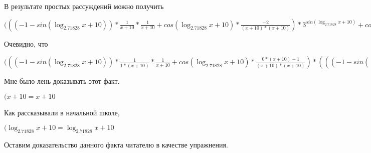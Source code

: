 \documentclass[12pt,a4paper,fleqn]{article}
\theoremstyle{definition}
\begin{document}
В результате простых рассуждений можно получить

$((( -1  - sin(\log_{ 2.71828 }{ x  +  10 })) * \frac{ 1 }{ x  +  10 }
 * \frac{ 1 }{ x  +  10 }
 + cos(\log_{ 2.71828 }{ x  +  10 }) * \frac{ -2 }{( x  +  10 ) * ( x  +  10 )}
) * { 3 }^{sin(\log_{ 2.71828 }{ x  +  10 })} + cos(\log_{ 2.71828 }{ x  +  10 }) * \frac{ 1 }{ x  +  10 }
 * cos(\log_{ 2.71828 }{ x  +  10 }) * \frac{ 1 }{ x  +  10 }
 * { 3 }^{sin(\log_{ 2.71828 }{ x  +  10 })} = (( -1  - sin(\log_{ 2.71828 }{ x  +  10 })) * \frac{ 1 }{ x  +  10 }
 * \frac{ 1 }{ x  +  10 }
 + cos(\log_{ 2.71828 }{ x  +  10 }) * \frac{ -2 }{( x  +  10 ) * ( x  +  10 )}
) * { 3 }^{sin(\log_{ 2.71828 }{ x  +  10 })} + cos(\log_{ 2.71828 }{ x  +  10 }) * \frac{ 1 }{ x  +  10 }
 * cos(\log_{ 2.71828 }{ x  +  10 }) * \frac{ 1 }{ x  +  10 }
 * { 3 }^{sin(\log_{ 2.71828 }{ x  +  10 })}$

Очевидно, что

$((( -1  - sin(\log_{ 2.71828 }{ x  +  10 })) * \frac{ 1 }{ 1  * ( x  +  10 )}
 * \frac{ 1 }{ x  +  10 }
 + cos(\log_{ 2.71828 }{ x  +  10 }) * \frac{ 0  * ( x  +  10 ) -  1 }{( x  +  10 ) * ( x  +  10 )}
) * ((( -1  - sin(\log_{ 2.71828 }{ x  +  10 })) * \frac{ 1 }{ x  +  10 }
 * \frac{ 1 }{ x  +  10 }
 + cos(\log_{ 2.71828 }{ x  +  10 }) * \frac{ -2 }{( x  +  10 ) * ( x  +  10 )}
) * { 3 }^{sin(\log_{ 2.71828 }{ x  +  10 })} + cos(\log_{ 2.71828 }{ x  +  10 }) * \frac{ 1 }{ x  +  10 }
 * cos(\log_{ 2.71828 }{ x  +  10 }) * \frac{ 1 }{ x  +  10 }
 * { 3 }^{sin(\log_{ 2.71828 }{ x  +  10 })}) = (( -1  - sin(\log_{ 2.71828 }{ x  +  10 })) * \frac{ 1 }{ 1  * ( x  +  10 )}
 * \frac{ 1 }{ x  +  10 }
 + cos(\log_{ 2.71828 }{ x  +  10 }) * \frac{ 0  * ( x  +  10 ) -  1 }{( x  +  10 ) * ( x  +  10 )}
) * ((( -1  - sin(\log_{ 2.71828 }{ x  +  10 })) * \frac{ 1 }{ x  +  10 }
 * \frac{ 1 }{ x  +  10 }
 + cos(\log_{ 2.71828 }{ x  +  10 }) * \frac{ -2 }{( x  +  10 ) * ( x  +  10 )}
) * { 3 }^{sin(\log_{ 2.71828 }{ x  +  10 })} + cos(\log_{ 2.71828 }{ x  +  10 }) * \frac{ 1 }{ x  +  10 }
 * cos(\log_{ 2.71828 }{ x  +  10 }) * \frac{ 1 }{ x  +  10 }
 * { 3 }^{sin(\log_{ 2.71828 }{ x  +  10 })})$

Мне было лень доказывать этот факт.

$( x  +  10  =  x  +  10 $

Как рассказывали в начальной школе,

$(\log_{ 2.71828 }{ x  +  10 } = \log_{ 2.71828 }{ x  +  10 }$

Оставим доказательство данного факта читателю в качестве упражнения.
\end{document}

